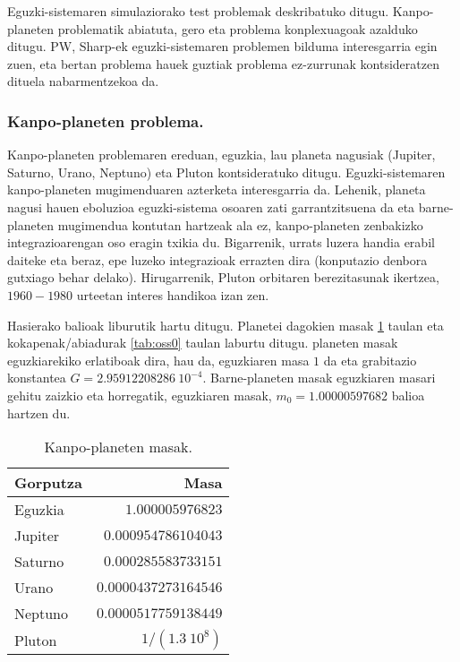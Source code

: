 Eguzki-sistemaren simulaziorako test problemak deskribatuko ditugu. Kanpo-planeten problematik abiatuta, gero eta problema konplexuagoak azalduko ditugu. PW, Sharp-ek \cite{Sharp2001} eguzki-sistemaren problemen bilduma interesgarria egin zuen, eta bertan problema hauek guztiak  problema ez-zurrunak kontsideratzen dituela nabarmentzekoa da.


\subsubsection*{Kanpo-planeten problema.}


Kanpo-planeten problemaren ereduan, eguzkia, lau planeta nagusiak (Jupiter, Saturno, Urano, Neptuno) eta Pluton kontsideratuko ditugu. Eguzki-sistemaren kanpo-planeten  mugimenduaren azterketa interesgarria da. Lehenik, planeta nagusi hauen eboluzioa eguzki-sistema osoaren zati garrantzitsuena da eta barne-planeten mugimendua kontutan hartzeak ala ez, kanpo-planeten zenbakizko integrazioarengan oso eragin txikia du. Bigarrenik, urrats luzera handia erabil daiteke eta beraz, epe luzeko integrazioak errazten dira (konputazio denbora gutxiago behar delako). Hirugarrenik, Pluton orbitaren berezitasunak ikertzea,  $1960-1980$ urteetan interes handikoa izan zen.        


Hasierako balioak \cite{Hairer2006} liburutik hartu ditugu. Planetei dagokien masak \ref{tab:ossm0} taulan eta kokapenak/abiadurak \ref{tab:oss0} taulan laburtu ditugu. planeten masak eguzkiarekiko erlatiboak dira, hau da, eguzkiaren masa $1$ da eta grabitazio konstantea $G=2.95912208286 \ 10^{-4}$. Barne-planeten masak eguzkiaren masari gehitu zaizkio eta horregatik, eguzkiaren masak, $m_0=1.00000597682$ balioa hartzen du.

\begin{table}[h]
\caption{Kanpo-planeten masak.}
\label{tab:ossm0}       %
\centering
\begin{tabular}{ l r }
\hline 
  Gorputza         &  Masa        
\\\hline
  Eguzkia          &  $1.000005976823$ \\
  Jupiter          &  $0.000954786104043$ \\
  Saturno          &  $0.000285583733151$ \\
  Urano            &  $0.0000437273164546$ \\
  Neptuno          &  $0.0000517759138449$ \\
  Pluton           &  ${1}/{(1.3 \ 10^8)}$ \\
\hline  
\end{tabular}
\end{table}

